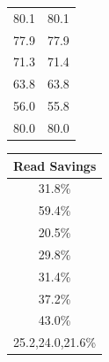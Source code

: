 \begin{table}[t]
\begin{tabular}{|c|c|}
    80.1 & 80.1\\ 
    77.9 & 77.9 \\ 
    71.3 & 71.4 \\ 
    63.8 & 63.8 \\ 
    56.0 & {\color{red}55.8} \\
    80.0 & 80.0 \\ 
    \end{tabular}
    \begin{tabular}{|c}
    \\
    Read Savings \\
    \hline
    31.8\%\\ 
    59.4\%\\ 
    20.5\%\\ 
    29.8\%\\ 
    31.4\%\\ 
    37.2\%\\ 
    43.0\% \\
    25.2,24.0,21.6\%\\ 
    \end{tabular}
    

\end{table}
